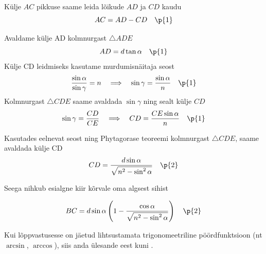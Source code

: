 Külje $AC$ pikkuse saame leida lõikude $AD$ ja $CD$ kaudu
\[ AC = AD - CD  \quad \p{1}\]

Avaldame külje AD kolmnurgast $\triangle{ADE}$
\[ AD = d\tan{\alpha} \quad \p{1}\]
Külje CD leidmiseks kasutame murdumisnäitaja seost
\[ \frac{\sin{\alpha}}{\sin{\gamma}} = n \quad \Longrightarrow \quad \sin{\gamma} = \frac{\sin{\alpha}}{n} \quad   \p{1}\]
Kolmnurgast  $\triangle{CDE}$ saame avaldada $\sin{\gamma}$ ning sealt külje $CD$
\[ \sin{\gamma} = \frac{CD}{CE} \quad \Longrightarrow \quad  CD = \frac{CE \sin{\alpha}}{n} \quad\p{1}\]

Kasutades eelnevat seost ning Phytagorase teoreemi kolmnurgast $\triangle{CDE}$,
saame avaldada külje CD
\[  CD = \frac{d\sin{\alpha}}{\sqrt{n^2-\sin^2{\alpha}}} \quad \p{2}  \]

Seega nihkub esialgne kiir kõrvale oma algsest sihist 

\[ BC = d\sin{\alpha}\left(1 - \frac{\cos{\alpha}}{\sqrt{n^2-\sin^2{\alpha}}}\right)  \quad \p{2}  \]

Kui lõppvastusesse on jäetud lihtsustamata trigonomeetriline pöördfunktsioon (nt $\arcsin$, $\arccos$), siis anda ülesande eest kuni .
\probend